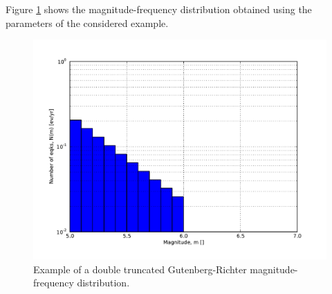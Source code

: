 \begin{description}
    Figure \ref{fig:dt_gr_mfd} shows the magnitude-frequency distribution 
    obtained using the parameters of the considered example.
\begin{figure}[!ht]
\centering
\includegraphics[width=12cm]{./figures/hazard/dt_mfd.pdf}
\caption{Example of a double truncated Gutenberg-Richter 
magnitude-frequency distribution.}
\label{fig:dt_gr_mfd}
\end{figure}
%
%

\end{description}
